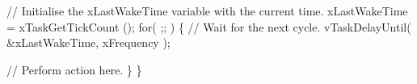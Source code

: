 \begin{DoxyPre}    // Initialise the xLastWakeTime variable with the current time.
    xLastWakeTime = xTaskGetTickCount ();
    for( ;; )
    \{
     // Wait for the next cycle.
     vTaskDelayUntil( \&xLastWakeTime, xFrequency );\end{DoxyPre}



\begin{DoxyPre}     // Perform action here.
    \}
\}
  \end{DoxyPre}
 